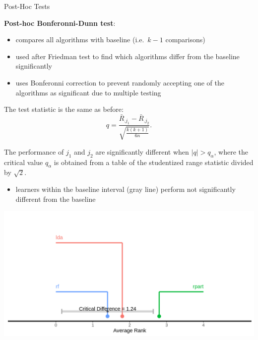 \begin{frame}[c,allowframebreaks]{Post-Hoc Tests}
    \framebreak

    \textbf{Post-hoc Bonferonni-Dunn test}:

    \begin{itemize}
    \item compares all algorithms with baseline (i.e.\ $k-1$ comparisons)
    \item used after Friedman test to find which algorithms differ from the baseline significantly
    \item uses Bonferonni correction to prevent randomly accepting one of the algorithms as significant due to multiple testing
    \end{itemize}
    The test statistic is the same as before:
    $$q = \frac{\bar{R}_{.j_1} - \bar{R}_{.j_2}}{\sqrt{\frac{k(k+1)}{6n}}}.$$

    The performance of $j_1$ and $j_2$ are significantly different when $|q| >
    q_{\alpha}$, where the critical value $q_{\alpha}$ is obtained from a table
    of the studentized range statistic divided by $\sqrt{2}$.

    \framebreak

    \begin{itemize}
        \item learners within the baseline interval (gray line) perform not
            significantly different from the baseline
    \end{itemize}
    \begin{center}
        \includegraphics[height=.6\textheight]{images/crit-diff-bd}
    \end{center}

    \end{frame}

